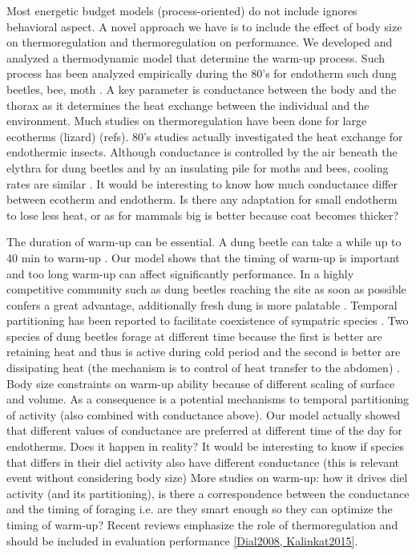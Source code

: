 Most energetic budget models (process-oriented) do not include ignores behavioral aspect.
A novel approach we have is to include the effect of body size on thermoregulation and thermoregulation on performance.
We developed and analyzed a thermodynamic model that determine the warm-up process.
Such process has been analyzed empirically during the 80's  for endotherm  such dung beetles, bee, moth \citep{Heinrich1975, Bartholomew1978, Bartholomew1981}.
A key parameter is conductance between the body and the thorax as it determines the heat exchange between the individual and the environment.
Much studies on thermoregulation have been done for large ecotherms (lizard) (refs).
80's studies actually investigated the heat exchange for endothermic insects.
Although conductance is controlled by the air beneath the elythra for dung beetles and by an insulating pile for moths and bees, cooling rates are similar \citep{Bartholomew1978}.  
It would be interesting to know  how much conductance differ between ecotherm and endotherm.
Is there any adaptation for small endotherm to lose less heat, or as for mammals big is better because coat becomes thicker?

The duration of warm-up can be essential.
A dung beetle can take a while up to 40 min to warm-up \citep{Verdu2008}.
Our  model shows that the timing of warm-up is important and too long warm-up can affect significantly performance.
In a highly competitive community such as dung beetles reaching the site as soon as possible confers a great advantage, additionally fresh dung is more palatable \citep{Hanski1991}.
Temporal partitioning has been reported to facilitate coexistence of sympatric species \citep{Verdu2007, Verdu2012}.
Two species of dung beetles forage at different time because the first is better are retaining heat and thus is active during cold period and the second is better are dissipating heat (the mechanism is to control of heat transfer to the abdomen) \citep{Verdu2012}.
Body size constraints on warm-up ability because of different scaling of surface and volume.
As a consequence is a potential mechanisms to temporal partitioning of activity (also combined with conductance above).
Our model actually showed that different values of conductance are preferred at different time of the day for endotherms.
Does it happen in reality? %
It would be interesting to know if species that differs in their diel activity also have different conductance (this is relevant event without considering body size)  
More studies on warm-up: how it drives diel activity (and its partitioning), is there a correspondence between the conductance and the timing of foraging i.e. are they smart enough so they can optimize the timing of warm-up? 
Recent reviews emphasize the role of thermoregulation and should be included in evaluation performance \cref{Dial2008, Kalinkat2015}.


